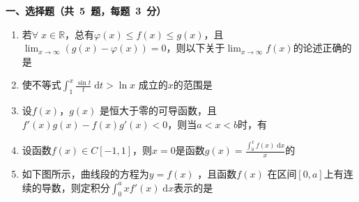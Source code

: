 \documentclass[11pt,a4paper]{ctexart}
\def\d{\,\mathrm{d}}
\def\d{\;\mathrm{d}}
\begin{document}
\begin{framed}

    \begin{large}	
    \vspace{4mm} \noindent \textbf{一、选择题（共~5~题，每题~3~分）}
	\end{large}
    \begin{enumerate}

		\item  若\(\forall\; x \in \mathbb{R}\)，总有\(\varphi(x) \leq f(x) \leq g(x)\)，且\(\displaystyle \lim _{x \to \infty} (g(x) - \varphi(x)) = 0\)，则以下关于\(\displaystyle \lim _{x \to \infty}f(x)\)的论述正确的是\kh{}

		\item 使不等式\(\displaystyle \int_1^x \frac{\sin t}{t}\d t > \ln x\)	成立的\(x\)的范围是\kh{}
		
		\item 设\(f(x)\)，\(g(x)\)	是恒大于零的可导函数，且\(f'(x)g(x) - f(x)g'(x) < 0\)，则当\(a < x < b\)时，有\kh{}

		\item 设函数\(f(x) \in C[-1, 1]\)，则\(x = 0\)是函数\(g(x) = \displaystyle\frac{\displaystyle \int_0^xf(x) \d x}{x}\)的\kh{}

		\item 如下图所示，曲线段的方程为\(y = f(x)\)	，且函数\(f(x)\)	在区间\([0, a]\)上有连续的导数，则定积分\(\int_0^a xf'(x)\d x \)表示的是 \kh{}
		

\end{enumerate}
\end{framed}
\end{document}
